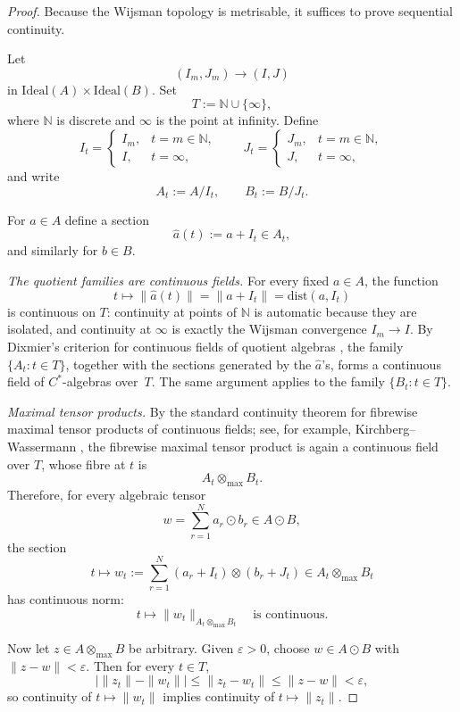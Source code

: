 \documentclass[12pt,fleqn,a4paper]{amsart}
\renewcommand{\le}{\leqslant}
\numberwithin{equation}{section}
\theoremstyle{definition}
\newcommand{\N}{\mathbb{N}}
\newcommand{\Ideal}{\mathrm{Ideal}}
\newcommand{\dist}{\mathrm{dist}}
\begin{document}
\begin{proof}
Because the Wijsman topology is metrisable, it suffices to prove sequential continuity.

Let
\[
(I_m,J_m)\longrightarrow (I,J)
\]
in $\Ideal(A)\times \Ideal(B)$.
Set
\[
T:=\N\cup\{\infty\},
\]
where $\N$ is discrete and $\infty$ is the point at infinity.
Define
\[
I_t=
\begin{cases}
I_m,& t=m\in\N,\\
I,& t=\infty,
\end{cases}
\qquad
J_t=
\begin{cases}
J_m,& t=m\in\N,\\
J,& t=\infty,
\end{cases}
\]
and write
\[
A_t:=A/I_t,\qquad B_t:=B/J_t.
\]

For $a\in A$ define a section
\[
\widehat a(t):=a+I_t\in A_t,
\]
and similarly for $b\in B$.

\smallskip
\noindent\emph{The quotient families are continuous fields.}
For every fixed $a\in A$, the function
\[
t\longmapsto \|\widehat a(t)\|
=
\|a+I_t\|
=
\dist(a,I_t)
\]
is continuous on $T$: continuity at points of $\N$ is automatic because they are isolated,
and continuity at $\infty$ is exactly the Wijsman convergence $I_m\to I$.
By Dixmier's criterion for continuous fields of quotient algebras
\cite[Prop.~10.3.2]{Dixmier1977}, the family $\{A_t:t\in T\}$, together with the
sections generated by the $\widehat a$'s, forms a continuous field of $C^*$-algebras
over~$T$.
The same argument applies to the family $\{B_t:t\in T\}$.

\smallskip
\noindent\emph{Maximal tensor products.}
By the standard continuity theorem for fibrewise maximal tensor products of continuous
fields; see, for example, Kirchberg--Wassermann \cite{KirchbergWassermann1995}, the
fibrewise maximal tensor product is again a continuous field over $T$, whose fibre at $t$ is
\[
A_t\otimes_{\max} B_t.
\]
Therefore, for every algebraic tensor
\[
w=\sum_{r=1}^{N} a_r\odot b_r\in A\odot B,
\]
the section
\[
t\longmapsto
w_t:=
\sum_{r=1}^{N}(a_r+I_t)\otimes (b_r+J_t)
\in A_t\otimes_{\max} B_t
\]
has continuous norm:
\[
t\longmapsto \|w_t\|_{A_t\otimes_{\max} B_t}
\quad\text{is continuous.}
\]

Now let $z\in A\otimes_{\max} B$ be arbitrary.
Given $\varepsilon>0$, choose $w\in A\odot B$ with $\|z-w\|<\varepsilon$.
Then for every $t\in T$,
\[
\bigl|\|z_t\|-\|w_t\|\bigr|
\le \|z_t-w_t\|
\le \|z-w\|
<\varepsilon,
\]
so continuity of $t\mapsto \|w_t\|$ implies continuity of $t\mapsto \|z_t\|$.


\end{proof}
\end{document}
